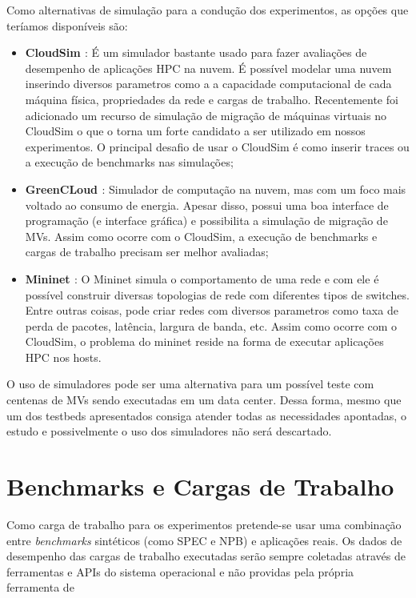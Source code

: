 \documentclass[10pt, conference, compsocconf]{IEEEtran}
\begin{document}
Como alternativas de simulação para a condução dos experimentos, as opções que teríamos disponíveis são:
\begin{itemize}
    \item \textbf{CloudSim \cite{Calheiros:2011}}: É um simulador bastante usado para fazer avaliações de desempenho de aplicações HPC na nuvem. É possível modelar uma nuvem inserindo diversos parametros como a a capacidade computacional de cada máquina física, propriedades da rede e cargas de trabalho. Recentemente foi adicionado um recurso de simulação de migração de máquinas virtuais no CloudSim o que o torna um forte candidato a ser utilizado em nossos experimentos. O principal desafio de usar o CloudSim é como inserir traces ou a execução de benchmarks nas simulações; 
    \item \textbf{GreenCLoud \cite{Kliazovich:2010}}: Simulador de computação na nuvem, mas com um foco mais voltado ao consumo de energia. Apesar disso, possui uma boa interface de programação (e interface gráfica) e possibilita a simulação de migração de MVs. Assim como ocorre com o CloudSim, a execução de benchmarks e cargas de trabalho precisam ser melhor avaliadas;
    \item \textbf{Mininet \cite{Handigol:2012}}: O Mininet simula o comportamento de uma rede e com ele é possível construir diversas topologias de rede com diferentes tipos de switches. Entre outras coisas, pode criar redes com diversos parametros como taxa de perda de pacotes, latência, largura de banda, etc. Assim como ocorre com o CloudSim, o problema do mininet reside na forma de executar aplicações HPC nos hosts.
\end{itemize}

O uso de simuladores pode ser uma alternativa para um possível teste com centenas de MVs  sendo executadas em um data center. Dessa forma, mesmo que um dos testbeds apresentados consiga atender todas as necessidades apontadas, o estudo e possivelmente o uso dos simuladores não será descartado.


\section{Benchmarks e Cargas de Trabalho}
Como carga de trabalho para os experimentos pretende-se usar uma combinação entre \textit{benchmarks} sintéticos (como SPEC e NPB) e aplicações reais. Os dados de desempenho das cargas de trabalho executadas serão sempre coletadas através de ferramentas e APIs do sistema operacional e não providas pela própria ferramenta de 
\end{document}
